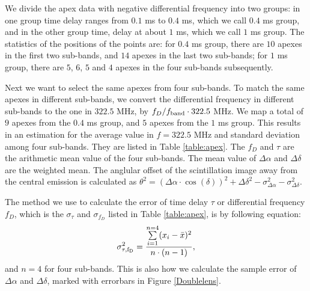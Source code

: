 \documentclass[useAMS,usenatbib]{mn2e}
\begin{document}
We divide the apex data with negative differential frequency into two groups: in one group time delay ranges from $0.1$ ms to $0.4$ ms, which we call $0.4$ ms group, and in the other group time, delay at about $1$ ms, which we call $1$ ms group. The statistics of the positions of the points are: for $0.4$ ms group, there are $10$ apexes in the first two sub-bands, and $14$ apexes in the last two sub-bands; for $1$ ms group, there are $5$, $6$, $5$ and $4$ apexes in the four sub-bands subsequently. 

Next we want to select the same apexes from four sub-bands. To match the same apexes in different sub-bands, we convert the differential frequency in different sub-bands to the one in $322.5$ MHz, by $f_D/f_{\rm band}\cdot322.5$ MHz. We map
a total of $9$ apexes from the $0.4$ ms group, and $5$ apexes from the $1$ ms
group. This results in an estimation
for the average value in $f=322.5$ MHz and standard deviation among four sub-bands. They are listed in Table
\ref{table:apex}. The $f_D$ and $\tau$ are the arithmetic mean value of the four sub-bands. 
The mean value of $\Delta\alpha$ and $\Delta\delta$ are the weighted mean.
The anglular offset of the scintillation image away from the central emission is calculated as ${\theta}^2=({\Delta\alpha}\cdot\cos(\delta))^2+{\Delta\delta}^2-\sigma^2_{\Delta\alpha}-\sigma^2_{\Delta\delta}$. 

The method we use to calculate the error of time delay $\tau$ or differential frequency $f_D$, which is the $\sigma_{\tau}$ and $\sigma_{f_D}$ listed in Table \ref{table:apex}, is by following equation:
\begin{equation}
\begin{aligned}
{\sigma^2_{\rm \tau, f_D}} = \frac{\sum\limits^{n=4}_{i=1}(x_i-\bar{x})^2}{n\cdot(n-1)},
\end{aligned}
\end{equation}
and $n=4$ for four sub-bands. This is also how we calculate the sample error of $\Delta\alpha$ and $\Delta\delta$, marked with errorbars in Figure \ref{Doublelens}.

\end{document}
